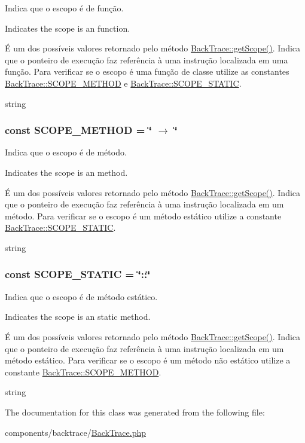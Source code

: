 Indica que o escopo é de função.

Indicates the scope is an function.

É um dos possíveis valores retornado pelo método \hyperlink{class_back_trace_0dce4e854dda57ffc316fd755df9b309}{BackTrace::getScope()}. Indica que o ponteiro de execução faz referência à uma instrução localizada em uma função. Para verificar se o escopo é uma função de classe utilize as constantes \hyperlink{class_back_trace_32fd91e8f98ebf2cd2370c1919be0b0d}{BackTrace::SCOPE\_\-METHOD} e \hyperlink{class_back_trace_096359905e9cd5f803f8414eea1a713b}{BackTrace::SCOPE\_\-STATIC}.

string \hypertarget{class_back_trace_32fd91e8f98ebf2cd2370c1919be0b0d}{
\subsubsection[{SCOPE\_\-METHOD}]{\setlength{\rightskip}{0pt plus 5cm}const {\bf SCOPE\_\-METHOD} = \char`\"{} $\rightarrow$ \char`\"{}}}
\label{class_back_trace_32fd91e8f98ebf2cd2370c1919be0b0d}


Indica que o escopo é de método.

Indicates the scope is an method.

É um dos possíveis valores retornado pelo método \hyperlink{class_back_trace_0dce4e854dda57ffc316fd755df9b309}{BackTrace::getScope()}. Indica que o ponteiro de execução faz referência à uma instrução localizada em um método. Para verificar se o escopo é um método estático utilize a constante \hyperlink{class_back_trace_096359905e9cd5f803f8414eea1a713b}{BackTrace::SCOPE\_\-STATIC}.

string \hypertarget{class_back_trace_096359905e9cd5f803f8414eea1a713b}{
\subsubsection[{SCOPE\_\-STATIC}]{\setlength{\rightskip}{0pt plus 5cm}const {\bf SCOPE\_\-STATIC} = \char`\"{}::\char`\"{}}}
\label{class_back_trace_096359905e9cd5f803f8414eea1a713b}


Indica que o escopo é de método estático.

Indicates the scope is an static method.

É um dos possíveis valores retornado pelo método \hyperlink{class_back_trace_0dce4e854dda57ffc316fd755df9b309}{BackTrace::getScope()}. Indica que o ponteiro de execução faz referência à uma instrução localizada em um método estático. Para verificar se o escopo é um método não estático utilize a constante \hyperlink{class_back_trace_32fd91e8f98ebf2cd2370c1919be0b0d}{BackTrace::SCOPE\_\-METHOD}.

string 

The documentation for this class was generated from the following file:\begin{CompactItemize}
\item 
components/backtrace/\hyperlink{_back_trace_8php}{BackTrace.php}\end{CompactItemize}
